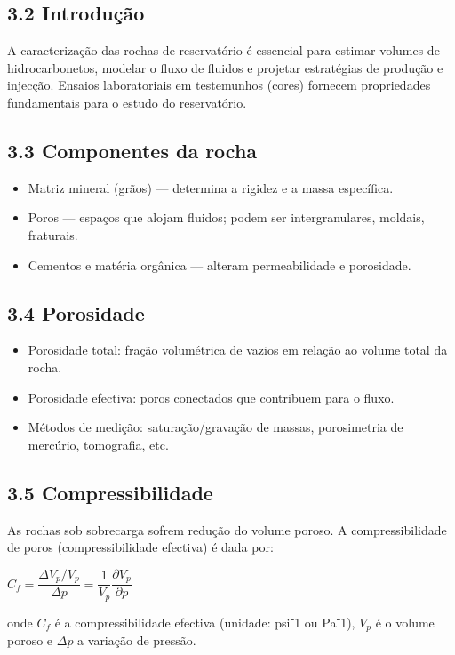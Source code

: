 \documentclass[11pt,a4paper]{article}
\begin{document}
\subsection{3.2 Introdução}
A caracterização das rochas de reservatório é essencial para estimar volumes de hidrocarbonetos, modelar o fluxo de fluidos e projetar estratégias de produção e injecção. Ensaios laboratoriais em testemunhos (cores) fornecem propriedades fundamentais para o estudo do reservatório.

\subsection{3.3 Componentes da rocha}
\begin{itemize}
\item Matriz mineral (grãos) — determina a rigidez e a massa específica.
\item Poros — espaços que alojam fluidos; podem ser intergranulares, moldais, fraturais.
\item Cementos e matéria orgânica — alteram permeabilidade e porosidade.
\end{itemize}

\subsection{3.4 Porosidade}
\begin{itemize}
\item Porosidade total: fração volumétrica de vazios em relação ao volume total da rocha.
\item Porosidade efectiva: poros conectados que contribuem para o fluxo.
\item Métodos de medição: saturação/gravação de massas, porosimetria de mercúrio, tomografia, etc.
\end{itemize}

\subsection{3.5 Compressibilidade}
As rochas sob sobrecarga sofrem redução do volume poroso. A compressibilidade de poros (compressibilidade efectiva) é dada por:

$C_f = \dfrac{\Delta V_p / V_p}{\Delta p} = \dfrac{1}{V_p}\dfrac{\partial V_p}{\partial p}$

onde $C_f$ é a compressibilidade efectiva (unidade: psi⁻1 ou Pa⁻1), $V_p$ é o volume poroso e $\Delta p$ a variação de pressão.
\end{document}
